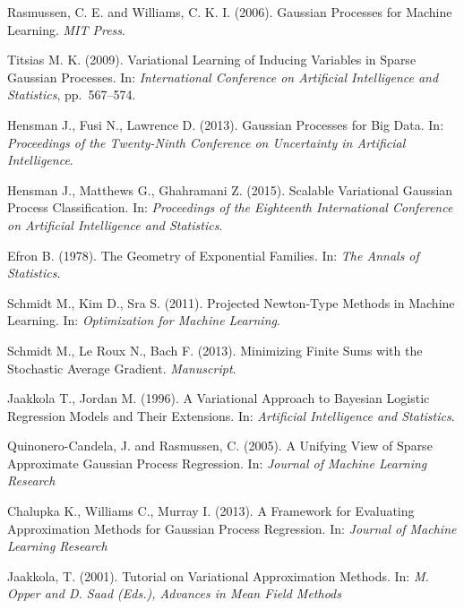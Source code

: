 \begin{thebibliography}{99}
	
	Rasmussen, C. E. and Williams, C. K. I. (2006). Gaussian Processes for Machine Learning. {\it MIT Press}.


	Titsias M. K. (2009).  Variational Learning of Inducing Variables in Sparse Gaussian
	Processes.  In: {\it International Conference on Artificial Intelligence and Statistics}, pp.~567–574.

	Hensman J., Fusi N., Lawrence D. (2013).  Gaussian Processes for Big Data.  In: {\it Proceedings of the Twenty-Ninth Conference on Uncertainty in Artificial Intelligence}.

	Hensman J., Matthews G., Ghahramani Z. (2015). Scalable Variational Gaussian Process Classification.  In: {\it Proceedings of the Eighteenth International Conference on Artificial Intelligence and Statistics}.

	Efron B. (1978). The Geometry of Exponential Families. In: {\it The Annals of Statistics}.

	Schmidt M., Kim D., Sra S. (2011). Projected Newton-Type Methods in Machine Learning. In: {\it Optimization for Machine Learning}.

	Schmidt M., Le Roux N., Bach F. (2013). Minimizing Finite Sums with the Stochastic Average Gradient. {\it Manuscript}.

	Jaakkola T., Jordan M. (1996). A Variational Approach to Bayesian Logistic Regression Models and Their Extensions. In: {\it Artificial Intelligence and Statistics}.

	Quinonero-Candela, J. and Rasmussen, C. (2005). A Unifying View of Sparse Approximate Gaussian Process Regression. In: {\it Journal of Machine Learning Research}

	Chalupka K., Williams C., Murray I. (2013). A Framework for Evaluating Approximation Methods for Gaussian Process Regression. In: {\it Journal of Machine Learning Research}

	Jaakkola, T. (2001). Tutorial on Variational Approximation Methods. In: {\it M. Opper and D. Saad (Eds.), Advances in Mean Field Methods}


\end{thebibliography}	